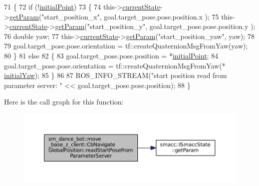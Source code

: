 \begin{DoxyCode}
71   \{
72     \textcolor{keywordflow}{if} (!\hyperlink{classsm__dance__bot_1_1move__base__z__client_1_1CbNavigateGlobalPosition_a7e8224311686be554d68853ff757be5d}{initialPoint})
73     \{
74       this->\hyperlink{classsmacc_1_1SmaccClientBehavior_af76fc9b877542ed5caf033f820c107d0}{currentState}->\hyperlink{classsmacc_1_1ISmaccState_abbb3a24b912c6e8de28f7b86123b6357}{getParam}(\textcolor{stringliteral}{"start\_position\_x"}, goal.target\_pose.pose.position.x
      );
75       this->\hyperlink{classsmacc_1_1SmaccClientBehavior_af76fc9b877542ed5caf033f820c107d0}{currentState}->\hyperlink{classsmacc_1_1ISmaccState_abbb3a24b912c6e8de28f7b86123b6357}{getParam}(\textcolor{stringliteral}{"start\_position\_y"}, goal.target\_pose.pose.position.y
      );
76       \textcolor{keywordtype}{double} yaw;
77       this->\hyperlink{classsmacc_1_1SmaccClientBehavior_af76fc9b877542ed5caf033f820c107d0}{currentState}->\hyperlink{classsmacc_1_1ISmaccState_abbb3a24b912c6e8de28f7b86123b6357}{getParam}(\textcolor{stringliteral}{"start\_position\_yaw"}, yaw);
78 
79       goal.target\_pose.pose.orientation = tf::createQuaternionMsgFromYaw(yaw);
80     \}
81     \textcolor{keywordflow}{else}
82     \{
83       goal.target\_pose.pose.position = *\hyperlink{classsm__dance__bot_1_1move__base__z__client_1_1CbNavigateGlobalPosition_a7e8224311686be554d68853ff757be5d}{initialPoint};
84       goal.target\_pose.pose.orientation = tf::createQuaternionMsgFromYaw(*
      \hyperlink{classsm__dance__bot_1_1move__base__z__client_1_1CbNavigateGlobalPosition_a2466eeabb6e2a3f35427a444a369d45e}{initialYaw});
85     \}
86 
87     ROS\_INFO\_STREAM(\textcolor{stringliteral}{"start position read from parameter server: "} << goal.target\_pose.pose.position);
88   \}
\end{DoxyCode}


Here is the call graph for this function\+:
\nopagebreak
\begin{figure}[H]
\begin{center}
\leavevmode
\includegraphics[width=350pt]{classsm__dance__bot_1_1move__base__z__client_1_1CbNavigateGlobalPosition_ad936dff37e9ca4d5ba0fb602ada6671e_cgraph}
\end{center}
\end{figure}




